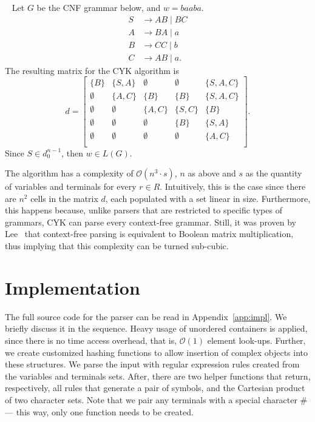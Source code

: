 \documentclass[12pt]{article}
\begin{document}
\emph{~\cite[Example 7.34.]{Hopcroft:book:2006}} Let $G$ be the CNF grammar below, and $w = baaba$.
\begin{align*}
    S &\rightarrow AB \mid BC \\
    A &\rightarrow BA \mid a \\
    B &\rightarrow CC \mid b \\
    C &\rightarrow AB \mid a.
\end{align*}
The resulting matrix for the CYK algorithm is
\[
    d = \begin{bmatrix}
        \{B\}     & \{S, A\}  & \emptyset & \emptyset & \{S, A, C\} \\
        \emptyset & \{A, C\}  & \{B\}     & \{B\}     & \{S, A, C\} \\
        \emptyset & \emptyset & \{A, C\}  & \{S, C\}  & \{B\}       \\
        \emptyset & \emptyset & \emptyset & \{B\}     & \{S, A\}    \\
        \emptyset & \emptyset & \emptyset & \emptyset & \{A, C\}    \\
    \end{bmatrix}.
\]
Since $S \in d_{0}^{n - 1}$, then $w \in L(G)$.

The algorithm has a complexity of $\mathcal{O}(n^{3} \cdot s)$, $n$ as above and $s$ as the quantity of variables and terminals for every $r \in R$. Intuitively, this is the case since there are $n^{2}$ cells in the matrix $d$, each populated with a set linear in size. Furthermore, this happens because, unlike parsers that are restricted to specific types of grammars, CYK can parse every context-free grammar. Still, it was proven by Lee~\cite{Lee:article:2002:jan} that context-free parsing is equivalent to Boolean matrix multiplication, thus implying that this complexity can be turned sub-cubic.

\section{Implementation}\label{sec:imp}

The full source code for the parser can be read in Appendix~\ref{app:impl}. We briefly discuss it in the sequence. Heavy usage of unordered containers is applied, since there is no time access overhead, that is, $\mathcal{O}(1)$ element look-ups. Further, we create customized hashing functions to allow insertion of complex objects into these structures. We parse the input with regular expression rules created from the variables and terminals sets. After, there are two helper functions that return, respectively, all rules that generate a pair of symbols, and the Cartesian product of two character sets. Note that we pair any terminals with a special character $\#$ --- this way, only one function needs to be created. 
\end{document}
